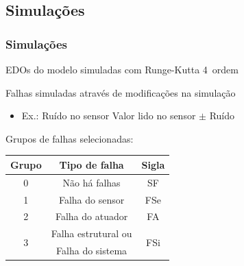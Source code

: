 \documentclass{beamer}
\begin{document}
\subsection{Simulações}
\begin{frame}
    \frametitle{Simulações}

    EDOs do modelo simuladas com Runge-Kutta 4\textordfeminine\ ordem

    \vspace{0.25cm}

    Falhas simuladas através de modificações na simulação

\begin{itemize}
    \item Ex.: Ruído no sensor \implica Valor lido no sensor $\pm$ Ruído 
\end{itemize}

    Grupos de falhas selecionadas:

\begin{table}[!htb]
\small
\centering
\begin{tabular}{|c|c|c|}
\hline
{\bf Grupo} & {\bf Tipo de falha} & {\bf Sigla}\\
\hline
\hline
0 & Não há falhas & SF\\
\hline
1 & Falha do sensor & FSe\\
\hline
2 & Falha do atuador & FA\\
\hline
\multirow{2}{*}{3} & 
Falha estrutural ou & 
\multirow{2}{*}{FSi}\\
&
Falha do sistema & 
\\
\hline
\end{tabular}
\end{table}
\end{frame}
\end{document}
